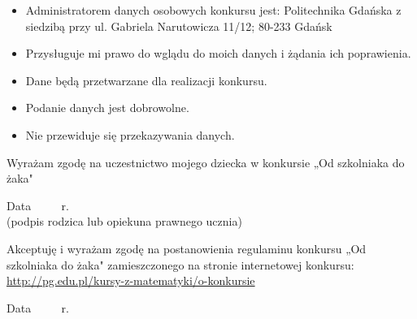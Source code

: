 \documentclass[10pt]{article}
\begin{document}
\begin{itemize}
  \item Administratorem danych osobowych konkursu jest: Politechnika Gdańska z siedzibą przy ul. Gabriela Narutowicza 11/12; 80-233 Gdańsk
  \item Przysługuje mi prawo do wglądu do moich danych i żądania ich poprawienia.
  \item Dane będą przetwarzane dla realizacji konkursu.
  \item Podanie danych jest dobrowolne.
  \item Nie przewiduje się przekazywania danych.
\end{itemize}

Wyrażam zgodę na uczestnictwo mojego dziecka w konkursie „Od szkolniaka do żaka"

Data \(\qquad\) r.\\
(podpis rodzica lub opiekuna prawnego ucznia)

Akceptuję i wyrażam zgodę na postanowienia regulaminu konkursu „Od szkolniaka do żaka" zamieszczonego na stronie internetowej konkursu: \href{http://pg.edu.pl/kursy-z-matematyki/o-konkursie}{http://pg.edu.pl/kursy-z-matematyki/o-konkursie}

Data \(\qquad\) r.
\end{document}
